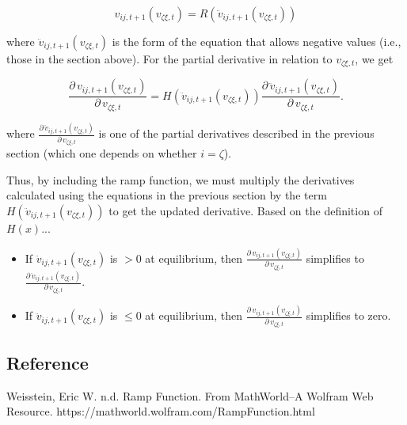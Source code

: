 \begin{equation*}
    v_{ij,t+1}(v_{\zeta\xi,t}) = R(\ddot{v}_{ij,t+1}(v_{\zeta\xi,t}))
\end{equation*}

\noindent where $\ddot{v}_{ij,t+1}(v_{\zeta\xi,t})$ is the form of the equation that
allows negative values (i.e., those in the section above).
For the partial derivative in relation to $v_{\zeta\xi,t}$, we get


\begin{equation*}
    \frac{\partial \, v_{ij,t+1}(v_{\zeta\xi,t})}{\partial \, v_{\zeta\xi,t}} =
        H(\ddot{v}_{ij,t+1}(v_{\zeta\xi,t}))
        \frac{\partial \, \ddot{v}_{ij,t+1}(v_{\zeta\xi,t})}{
            \partial \, v_{\zeta\xi,t} }
\text{.}
\end{equation*}

\noindent where
$\frac{\partial \, \ddot{v}_{ij,t+1}(v_{\zeta\xi,t})}{
\partial \, v_{\zeta\xi,t}}$
is one of the partial derivatives described in the previous section
(which one depends on whether $i = \zeta$).


Thus, by including the ramp function, we must multiply the derivatives
calculated using the equations in the previous section by the term
$H(\ddot{v}_{ij,t+1}(v_{\zeta\xi,t}))$ to get the updated derivative.
Based on the definition of $H(x)$...

\begin{itemize}
    \item If $\ddot{v}_{ij,t+1}(v_{\zeta\xi,t})$ is $> 0$ at equilibrium, then
        $\frac{\partial \, v_{ij,t+1}(v_{\zeta\xi,t})}{
            \partial \, v_{\zeta\xi,t}}$
        simplifies to $\frac{\partial \, \ddot{v}_{ij,t+1}(v_{\zeta\xi,t})}{
            \partial \, v_{\zeta\xi,t}}$.
    \item If $\ddot{v}_{ij,t+1}(v_{\zeta\xi,t})$ is $\le 0$ at equilibrium, then
        $\frac{\partial \, v_{ij,t+1}(v_{\zeta\xi,t})}{
            \partial \, v_{\zeta\xi,t}}$
        simplifies to zero.
\end{itemize}




\subsection*{Reference}

Weisstein, Eric W. n.d. Ramp Function.
From MathWorld--A Wolfram Web Resource.
https://mathworld.wolfram.com/RampFunction.html

